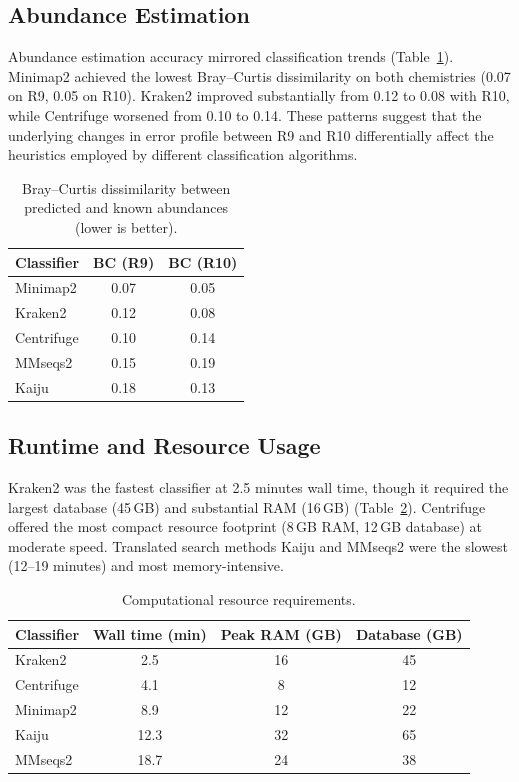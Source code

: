 \documentclass[11pt]{article}
\begin{document}
\subsection{Abundance Estimation}

Abundance estimation accuracy mirrored classification trends (Table~\ref{tab:abundance}). Minimap2 achieved the lowest Bray--Curtis dissimilarity on both chemistries (0.07 on R9, 0.05 on R10). Kraken2 improved substantially from 0.12 to 0.08 with R10, while Centrifuge worsened from 0.10 to 0.14. These patterns suggest that the underlying changes in error profile between R9 and R10 differentially affect the heuristics employed by different classification algorithms.

\begin{table}[h]
\centering
\caption{Bray--Curtis dissimilarity between predicted and known abundances (lower is better).}
\label{tab:abundance}
\begin{tabular}{lcc}
\toprule
Classifier & BC (R9) & BC (R10) \\
\midrule
Minimap2 & 0.07 & 0.05 \\
Kraken2 & 0.12 & 0.08 \\
Centrifuge & 0.10 & 0.14 \\
MMseqs2 & 0.15 & 0.19 \\
Kaiju & 0.18 & 0.13 \\
\bottomrule
\end{tabular}
\end{table}

\subsection{Runtime and Resource Usage}

Kraken2 was the fastest classifier at 2.5 minutes wall time, though it required the largest database (45\,GB) and substantial RAM (16\,GB) (Table~\ref{tab:resources}). Centrifuge offered the most compact resource footprint (8\,GB RAM, 12\,GB database) at moderate speed. Translated search methods Kaiju and MMseqs2 were the slowest (12--19 minutes) and most memory-intensive.

\begin{table}[h]
\centering
\caption{Computational resource requirements.}
\label{tab:resources}
\begin{tabular}{lccc}
\toprule
Classifier & Wall time (min) & Peak RAM (GB) & Database (GB) \\
\midrule
Kraken2 & 2.5 & 16 & 45 \\
Centrifuge & 4.1 & 8 & 12 \\
Minimap2 & 8.9 & 12 & 22 \\
Kaiju & 12.3 & 32 & 65 \\
MMseqs2 & 18.7 & 24 & 38 \\
\bottomrule
\end{tabular}
\end{table}
\end{document}
